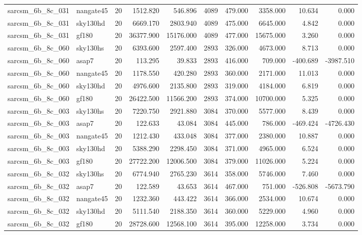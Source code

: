 \begin{tabular}{llrrrrrrrr}
sarcsm\_6b\_8c\_031 & nangate45 & 20 & 1512.820 & 546.896 & 4089 & 479.000 & 3358.000 & 10.634 & 0.000 \\
sarcsm\_6b\_8c\_031 & sky130hd & 20 & 6669.170 & 2803.940 & 4089 & 475.000 & 6645.000 & 4.842 & 0.000 \\
sarcsm\_6b\_8c\_031 & gf180 & 20 & 36377.900 & 15176.000 & 4089 & 477.000 & 15675.000 & 3.260 & 0.000 \\
sarcsm\_6b\_8c\_060 & sky130hs & 20 & 6393.600 & 2597.400 & 2893 & 326.000 & 4673.000 & 8.713 & 0.000 \\
sarcsm\_6b\_8c\_060 & asap7 & 20 & 113.295 & 39.833 & 2893 & 416.000 & 709.000 & -400.689 & -3987.510 \\
sarcsm\_6b\_8c\_060 & nangate45 & 20 & 1178.550 & 420.280 & 2893 & 360.000 & 2171.000 & 11.013 & 0.000 \\
sarcsm\_6b\_8c\_060 & sky130hd & 20 & 4976.600 & 2135.800 & 2893 & 319.000 & 4184.000 & 6.819 & 0.000 \\
sarcsm\_6b\_8c\_060 & gf180 & 20 & 26422.500 & 11566.200 & 2893 & 374.000 & 10700.000 & 5.325 & 0.000 \\
sarcsm\_6b\_8c\_003 & sky130hs & 20 & 7220.750 & 2921.880 & 3084 & 370.000 & 5577.000 & 8.439 & 0.000 \\
sarcsm\_6b\_8c\_003 & asap7 & 20 & 122.633 & 43.084 & 3084 & 445.000 & 786.000 & -469.424 & -4726.430 \\
sarcsm\_6b\_8c\_003 & nangate45 & 20 & 1212.430 & 433.048 & 3084 & 377.000 & 2380.000 & 10.887 & 0.000 \\
sarcsm\_6b\_8c\_003 & sky130hd & 20 & 5388.290 & 2298.450 & 3084 & 371.000 & 4965.000 & 6.524 & 0.000 \\
sarcsm\_6b\_8c\_003 & gf180 & 20 & 27722.200 & 12006.500 & 3084 & 379.000 & 11026.000 & 5.224 & 0.000 \\
sarcsm\_6b\_8c\_032 & sky130hs & 20 & 6774.940 & 2765.230 & 3614 & 358.000 & 5746.000 & 7.460 & 0.000 \\
sarcsm\_6b\_8c\_032 & asap7 & 20 & 122.589 & 43.653 & 3614 & 467.000 & 751.000 & -526.808 & -5673.790 \\
sarcsm\_6b\_8c\_032 & nangate45 & 20 & 1232.360 & 443.422 & 3614 & 366.000 & 2534.000 & 10.674 & 0.000 \\
sarcsm\_6b\_8c\_032 & sky130hd & 20 & 5111.540 & 2188.350 & 3614 & 360.000 & 5229.000 & 4.960 & 0.000 \\
sarcsm\_6b\_8c\_032 & gf180 & 20 & 28728.600 & 12568.100 & 3614 & 395.000 & 12258.000 & 3.734 & 0.000 \\

\end{tabular}
